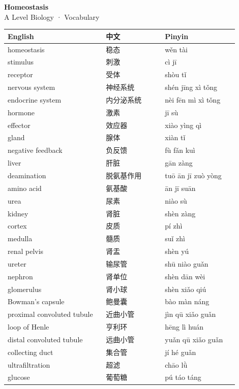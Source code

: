 \documentclass[11pt]{article}
\begin{document}
\begin{center}
  {\LARGE\bfseries Homeostasis}\\[0.35em]
  {\large A Level Biology · Vocabulary}
\end{center}
\vspace{0.6em}

\begin{longtable}{@{}p{0.40\linewidth}p{0.24\linewidth}p{0.30\linewidth}@{}}
\toprule
\textbf{English} & \textbf{中文} & \textbf{Pinyin} \\
\midrule
\endhead
\bottomrule
\endlastfoot
homeostasis & 稳态 & wěn tài \\
stimulus & 刺激 & cì jī \\
receptor & 受体 & shòu tǐ \\
nervous system & 神经系统 & shén jīng xì tǒng \\
endocrine system & 内分泌系统 & nèi fēn mì xì tǒng \\
hormone & 激素 & jī sù \\
effector & 效应器 & xiào yìng qì \\
gland & 腺体 & xiàn tǐ \\
negative feedback & 负反馈 & fù fǎn kuì \\
liver & 肝脏 & gān zàng \\
deamination & 脱氨基作用 & tuō ān jī zuò yòng \\
amino acid & 氨基酸 & ān jī suān \\
urea & 尿素 & niào sù \\
kidney & 肾脏 & shèn zàng \\
cortex & 皮质 & pí zhì \\
medulla & 髓质 & suǐ zhì \\
renal pelvis & 肾盂 & shèn yú \\
ureter & 输尿管 & shū niào guǎn \\
nephron & 肾单位 & shèn dān wèi \\
glomerulus & 肾小球 & shèn xiǎo qiú \\
Bowman's capsule & 鲍曼囊 & bào màn náng \\
proximal convoluted tubule & 近曲小管 & jìn qū xiǎo guǎn \\
loop of Henle & 亨利环 & hēng lì huán \\
distal convoluted tubule & 远曲小管 & yuǎn qū xiǎo guǎn \\
collecting duct & 集合管 & jí hé guǎn \\
ultrafiltration & 超滤 & chāo lǜ \\
glucose & 葡萄糖 & pú táo táng \\

\end{longtable}
\end{document}

